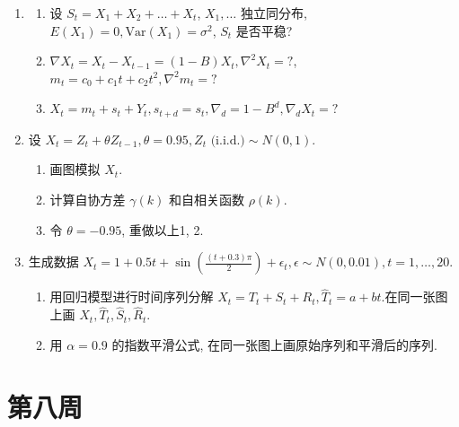 \begin{enumerate}
\item
\begin{enumerate}
    \item[1)] 设 $S_{t}=X_{1}+X_{2}+\dots+X_{t}$, $X_{1},\dots$ 独立同分布, $E(X_{1})=0, \text{Var}(X_{1})=\sigma^{2}$, $S_{t}$ 是否平稳?
    \item[2)] $\nabla X_{t}=X_{t}-X_{t-1}=(1-B)X_{t}, \nabla^{2}X_{t}=?$, $m_{t}=c_{0}+c_{1}t+c_{2}t^{2}, \nabla^{2}m_{t}=?$
    \item[3)] $X_{t}=m_{t}+s_{t}+Y_{t}, s_{t+d}=s_{t}, \nabla_{d}=1-B^{d}, \nabla_{d}X_{t}=?$
\end{enumerate}

\item 设 $X_{t}=Z_{t}+\theta Z_{t-1}, \theta=0.95, Z_{t} \text{ (i.i.d.)} \sim N(0,1)$.
\begin{enumerate}
    \item[1.] 画图模拟 $X_{t}$.
    \item[2.] 计算自协方差 $\gamma(k)$ 和自相关函数 $\rho(k)$.
    \item[3.] 令 $\theta=-0.95$, 重做以上1, 2.
\end{enumerate}

\item 生成数据 $X_{t}=1+0.5t+\sin\left(\frac{(t+0.3)\pi}{2}\right)+\epsilon_{t}, \epsilon\sim N(0,0.01), t=1,\dots,20$.
\begin{enumerate}
    \item[1.] 用回归模型进行时间序列分解 $X_{t}=T_{t}+S_{t}+R_{t}, \hat{T}_{t}=a+bt$.在同一张图上画 $X_{t}, \hat{T}_{t}, \hat{S}_{t}, \hat{R}_{t}$.
    \item[2.] 用 $\alpha=0.9$ 的指数平滑公式, 在同一张图上画原始序列和平滑后的序列.
\end{enumerate}

\end{enumerate}



\section{第八周}

